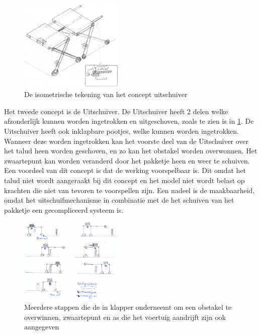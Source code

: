 \begin{figure}
    \centering
    \includegraphics[width=50mm]{04_idee_ontwikkeling/isom_uitschuiver.png}
    \caption{De isometrische tekening van het concept uitschuiver}
    \label{fig:isom_uitschuiver2.0}
\end{figure}
\vspace{\baselineskip}
Het tweede concept is de Uitschuiver. De Uitschuiver heeft 2 delen welke afzonderlijk kunnen worden ingetrokken en uitgeschoven, zoals te zien is in \cref{fig:isom_uitschuiver2.0}. De Uitschuiver heeft ook inklapbare pootjes, welke kunnen worden ingetrokken. Wanneer deze worden ingetrokken kan het voorste deel van de Uitschuiver over het talud heen worden geschoven, en zo kan het obstakel worden overwonnen. Het zwaartepunt kan worden veranderd door het pakketje heen en weer te schuiven. Een voordeel van dit concept is dat de werking voorspelbaar is. Dit omdat het talud niet wordt aangeraakt bij dit concept en het model niet wordt belast op krachten die niet van tevoren te voorspellen zijn. Een nadeel is de maakbaarheid, omdat het uitschuifmechanisme in combinatie met de het schuiven van het pakketje een gecompliceerd systeem is.

\begin{figure}
    \includegraphics[width=50mm]{04_idee_ontwikkeling/Verloop_systeem_driepoten.png}
    \caption{Meerdere stappen die de in klapper onderneemt om een obstakel te overwinnen, zwaartepunt en as die het voertuig aandrijft zijn ook aangegeven}
    \label{fig:stappen_inklapper_met_pakket2.0}
\end{figure}
\vspace{\baselineskip}



